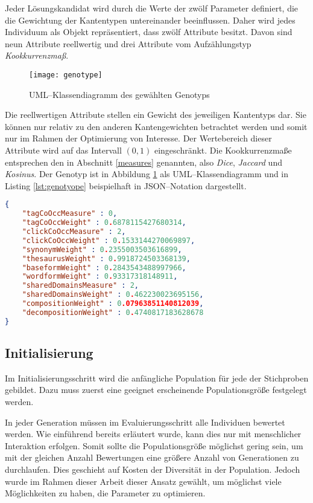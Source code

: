 Jeder Lösungskandidat wird durch die Werte der zwölf Parameter definiert, die die Gewichtung der Kantentypen untereinander beeinflussen. Daher wird jedes Individuum als Objekt repräsentiert, dass zwölf Attribute besitzt. Davon sind neun Attribute reellwertig und drei Attribute vom Aufzählungstyp \emph{Kookkurrenzmaß}.

\begin{figure}
\centering
\texttt{[image: genotype]}
\caption{UML--Klassendiagramm des gewählten Genotyps}
\label{fig:genotype}
\end{figure}

Die reellwertigen Attribute stellen ein Gewicht des jeweiligen Kantentyps dar. Sie können nur relativ zu den anderen Kantengewichten betrachtet werden und somit nur im Rahmen der Optimierung von Interesse. Der Wertebereich dieser Attribute wird auf das Intervall \((0,1)\) eingeschränkt. Die Kookkurrenzmaße entsprechen den in Abschnitt \ref{measures} genannten, also \emph{Dice}, \emph{Jaccard} und \emph{Kosinus}. Der Genotyp ist in Abbildung \ref{fig:genotype} als UML--Klassendiagramm und in Listing \ref{lst:genotyope} beispielhaft in JSON--Notation dargestellt.

\begin{lstlisting}[language=json, label={lst:genotyope}, caption={Beispiel für ein Individuum}]
{
    "tagCoOccMeasure" : 0,
    "tagCoOccWeight" : 0.6878115427680314,
    "clickCoOccMeasure" : 2,
    "clickCoOccWeight" : 0.1533144270069897,
    "synonymWeight" : 0.2355003503616899,
    "thesaurusWeight" : 0.9918724503368139,
    "baseformWeight" : 0.2843543488997966,
    "wordformWeight" : 0.93317318148911,
    "sharedDomainsMeasure" : 2,
    "sharedDomainsWeight" : 0.462230023695156,
    "compositionWeight" : 0.07963851140812039,
    "decompositionWeight" : 0.4740817183628678
}
\end{lstlisting}

\subsection{Initialisierung}

Im Initialisierungsschritt wird die anfängliche Population für jede der Stichproben gebildet. Dazu muss zuerst eine geeignet erscheinende Populationsgröße festgelegt werden.

In jeder Generation müssen im Evaluierungsschritt alle Individuen bewertet werden. Wie einführend bereits erläutert wurde, kann dies nur mit menschlicher Interaktion erfolgen. Somit sollte die Populationsgröße möglichst gering sein, um mit der gleichen Anzahl Bewertungen eine größere Anzahl von Generationen zu durchlaufen. Dies geschieht auf Kosten der Diversität in der Population. Jedoch wurde im Rahmen dieser Arbeit dieser Ansatz gewählt, um möglichst viele Möglichkeiten zu haben, die Parameter zu optimieren.

